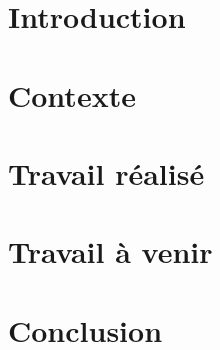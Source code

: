 \documentclass{report}
\begin{document}
    

    \tableofcontents
    
    \chapter*{Introduction}

    \chapter{Contexte}

    \chapter{Travail réalisé}

    \chapter{Travail à venir}
        

    \chapter*{Conclusion}
\end{document}
